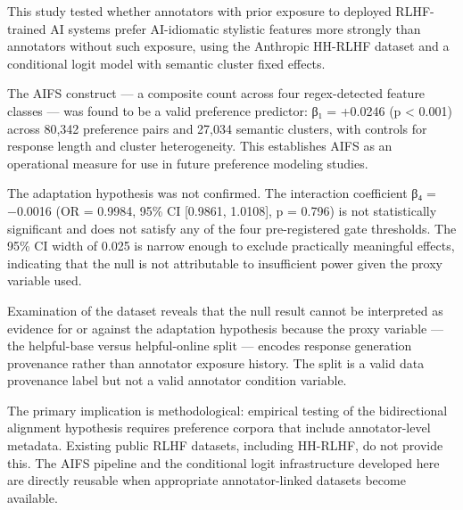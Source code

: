 
This study tested whether annotators with prior exposure to deployed RLHF-trained AI systems prefer AI-idiomatic stylistic features more strongly than annotators without such exposure, using the Anthropic HH-RLHF dataset and a conditional logit model with semantic cluster fixed effects.

The AIFS construct — a composite count across four regex-detected feature classes — was found to be a valid preference predictor: β₁ = +0.0246 (p < 0.001) across 80,342 preference pairs and 27,034 semantic clusters, with controls for response length and cluster heterogeneity. This establishes AIFS as an operational measure for use in future preference modeling studies.

The adaptation hypothesis was not confirmed. The interaction coefficient β₄ = −0.0016 (OR = 0.9984, 95\% CI [0.9861, 1.0108], p = 0.796) is not statistically significant and does not satisfy any of the four pre-registered gate thresholds. The 95\% CI width of 0.025 is narrow enough to exclude practically meaningful effects, indicating that the null is not attributable to insufficient power given the proxy variable used.

Examination of the dataset reveals that the null result cannot be interpreted as evidence for or against the adaptation hypothesis because the proxy variable — the helpful-base versus helpful-online split — encodes response generation provenance rather than annotator exposure history. The split is a valid data provenance label but not a valid annotator condition variable.

The primary implication is methodological: empirical testing of the bidirectional alignment hypothesis requires preference corpora that include annotator-level metadata. Existing public RLHF datasets, including HH-RLHF, do not provide this. The AIFS pipeline and the conditional logit infrastructure developed here are directly reusable when appropriate annotator-linked datasets become available.

